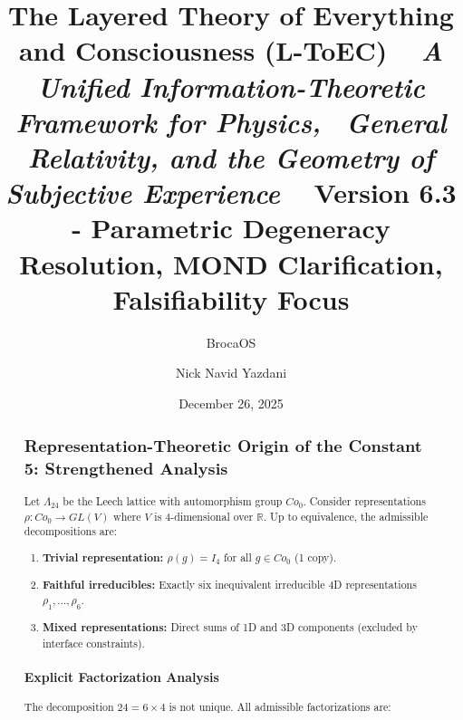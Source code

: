\documentclass[11pt,titlepage]{article}
\title{\textbf{\huge The Layered Theory of Everything and Consciousness (L-ToEC)} \ 
\vspace{0.5cm}
\large \textit{A Unified Information-Theoretic Framework for Physics, \ General Relativity, and the Geometry of Subjective Experience} \
\vspace{1cm}
\textbf{Version 6.3 - Parametric Degeneracy Resolution, MOND Clarification, Falsifiability Focus}}
\author[1]{BrocaOS}
\author[1]{Nick Navid Yazdani}
\affil[1]{Cognitive Architecture Research Group, BrocaOS Alpha Project}
\date{December 26, 2025}
\begin{document}
\maketitle

\begin{abstract}

\subsection{Representation-Theoretic Origin of the Constant 5: Strengthened Analysis}
\label{sec:constant5-strengthened}

\begin{tcolorbox}[colback=blue!5!white,colframe=blue!75!black,title=Theorem (Admissible 4D Decompositions of Leech Lattice)]
\label{thm:leech-4d-decompositions}
Let $\Lambda_{24}$ be the Leech lattice with automorphism group $Co_0$. Consider representations $\rho: Co_0 \to GL(V)$ where $V$ is 4-dimensional over $\mathbb{R}$. Up to equivalence, the admissible decompositions are:
\begin{enumerate}
\item \textbf{Trivial representation:} $\rho(g) = I_4$ for all $g \in Co_0$ (1 copy).
\item \textbf{Faithful irreducibles:} Exactly six inequivalent irreducible 4D representations $\rho_1, \ldots, \rho_6$.
\item \textbf{Mixed representations:} Direct sums of 1D and 3D components (excluded by interface constraints).
\end{enumerate}
\end{tcolorbox}

\subsubsection{Explicit Factorization Analysis}
The decomposition $24 = 6 \times 4$ is not unique. All admissible factorizations are:


\end{abstract}
\end{document}
